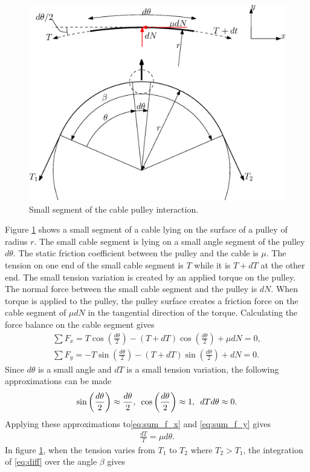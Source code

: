 \documentclass[10pt,cleanfoot]{asme2ej}
\newcommand{\hquad}{\hspace{0.5em}}
\begin{document}
\begin{figure}
    \centering
    \includegraphics[width = 0.5\columnwidth]{capstan_equation.eps}
    \caption{Small segment of the cable pulley interaction.}
    \label{fig:friction_fig}
\end{figure}
\par
Figure \ref{fig:friction_fig} shows a small  segment of a cable lying on the surface of a pulley of radius $r$. The small cable segment is lying on a small angle segment of the pulley $d\theta$. The static friction coefficient between the pulley and the cable is $\mu$. The tension on one end of the small cable segment is $T$ while it is $T+dT$ at the other end. The small tension variation is created by an applied torque on the pulley. The normal force between the small cable segment and the pulley  is $dN$. When torque is applied to the pulley, the pulley surface creates a friction force on the cable segment of $\mu dN$ in the tangential direction of the torque. Calculating the force balance on the cable segment gives 
\begin{align}
    \sum F_x = T\cos\left(\frac{d\theta}{2}\right) - (T+dT)\cos\left(\frac{d\theta}{2}\right) + \mu dN =0,\label{eq:sum_f_x}\\
    \sum F_y = -T\sin\left(\frac{d\theta}{2}\right)-(T+dT)\sin\left(\frac{d\theta}{2}\right)+dN = 0.\label{eq:sum_f_y}
\end{align}
Since $d\theta$ is a small angle and $dT$ is a small tension variation, the following approximations can be made
\begin{align}
    \sin\left(\frac{d\theta}{2}\right)\approx \frac{d\theta}{2},\hquad \cos\left(\frac{d\theta}{2}\right)\approx 1,\hquad dTd\theta \approx 0. 
\end{align}
Applying these approximations to\eqref{eq:sum_f_x} and \eqref{eq:sum_f_y} gives
\begin{align}
    \frac{dT}{T} = \mu d\theta. \label{eq:diff}
\end{align}
In figure \ref{fig:friction_fig}, when the tension varies from $T_1$ to $T_2$ where $T_2>T_1$, the integration of \eqref{eq:diff} over the angle $\beta$  gives
\end{document}
